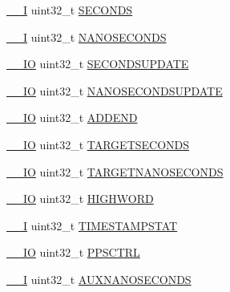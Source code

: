 \begin{DoxyCompactItemize}
\hyperlink{core__sc300_8h_af63697ed9952cc71e1225efe205f6cd3}{\+\_\+\+\_\+I} uint32\+\_\+t \hyperlink{struct_l_p_c___e_n_e_t___t_a499fd79274805d17ebceb8b0824c7e2c}{S\+E\+C\+O\+N\+DS}
\item 
\hyperlink{core__sc300_8h_af63697ed9952cc71e1225efe205f6cd3}{\+\_\+\+\_\+I} uint32\+\_\+t \hyperlink{struct_l_p_c___e_n_e_t___t_a509bec0d8aa03269d5e7f53eadad7fa0}{N\+A\+N\+O\+S\+E\+C\+O\+N\+DS}
\item 
\hyperlink{core__sc300_8h_aec43007d9998a0a0e01faede4133d6be}{\+\_\+\+\_\+\+IO} uint32\+\_\+t \hyperlink{struct_l_p_c___e_n_e_t___t_a8b15cea74eada05c941392b94fe06d2a}{S\+E\+C\+O\+N\+D\+S\+U\+P\+D\+A\+TE}
\item 
\hyperlink{core__sc300_8h_aec43007d9998a0a0e01faede4133d6be}{\+\_\+\+\_\+\+IO} uint32\+\_\+t \hyperlink{struct_l_p_c___e_n_e_t___t_ad72537d69dabab83f2b00dff9592498f}{N\+A\+N\+O\+S\+E\+C\+O\+N\+D\+S\+U\+P\+D\+A\+TE}
\item 
\hyperlink{core__sc300_8h_aec43007d9998a0a0e01faede4133d6be}{\+\_\+\+\_\+\+IO} uint32\+\_\+t \hyperlink{struct_l_p_c___e_n_e_t___t_ad317892e24185ffaf8cf0dea234ab708}{A\+D\+D\+E\+ND}
\item 
\hyperlink{core__sc300_8h_aec43007d9998a0a0e01faede4133d6be}{\+\_\+\+\_\+\+IO} uint32\+\_\+t \hyperlink{struct_l_p_c___e_n_e_t___t_a44c6ce663ba949f23d6511cf7ef8114d}{T\+A\+R\+G\+E\+T\+S\+E\+C\+O\+N\+DS}
\item 
\hyperlink{core__sc300_8h_aec43007d9998a0a0e01faede4133d6be}{\+\_\+\+\_\+\+IO} uint32\+\_\+t \hyperlink{struct_l_p_c___e_n_e_t___t_a1e9803d68624d654aa161cbdc510d329}{T\+A\+R\+G\+E\+T\+N\+A\+N\+O\+S\+E\+C\+O\+N\+DS}
\item 
\hyperlink{core__sc300_8h_aec43007d9998a0a0e01faede4133d6be}{\+\_\+\+\_\+\+IO} uint32\+\_\+t \hyperlink{struct_l_p_c___e_n_e_t___t_abbb7740671d3871ab634235ab5717a78}{H\+I\+G\+H\+W\+O\+RD}
\item 
\hyperlink{core__sc300_8h_af63697ed9952cc71e1225efe205f6cd3}{\+\_\+\+\_\+I} uint32\+\_\+t \hyperlink{struct_l_p_c___e_n_e_t___t_ad6c18e29576f80269933faf792f85fe0}{T\+I\+M\+E\+S\+T\+A\+M\+P\+S\+T\+AT}
\item 
\hyperlink{core__sc300_8h_aec43007d9998a0a0e01faede4133d6be}{\+\_\+\+\_\+\+IO} uint32\+\_\+t \hyperlink{struct_l_p_c___e_n_e_t___t_ad8f64bc7ac1581c660e982efe0763c3c}{P\+P\+S\+C\+T\+RL}
\item 
\hyperlink{core__sc300_8h_af63697ed9952cc71e1225efe205f6cd3}{\+\_\+\+\_\+I} uint32\+\_\+t \hyperlink{struct_l_p_c___e_n_e_t___t_ae1d236c58f2f8423d9293f12079b9a78}{A\+U\+X\+N\+A\+N\+O\+S\+E\+C\+O\+N\+DS}

\end{DoxyCompactItemize}
